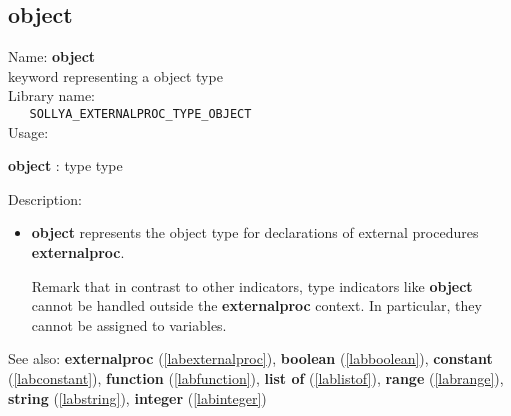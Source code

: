 \subsection{object}
\label{labobject}
\noindent Name: \textbf{object}\\
\phantom{aaa}keyword representing a \sollya object type \\[0.2cm]
\noindent Library name:\\
\verb|   SOLLYA_EXTERNALPROC_TYPE_OBJECT|\\[0.2cm]
\noindent Usage: 
\begin{center}
\textbf{object} : \textsf{type type}\\
\end{center}
\noindent Description: \begin{itemize}

\item \textbf{object} represents the \sollya object type for declarations
   of external procedures \textbf{externalproc}.
    
   Remark that in contrast to other indicators, type indicators like
   \textbf{object} cannot be handled outside the \textbf{externalproc} context.  In
   particular, they cannot be assigned to variables.
\end{itemize}
See also: \textbf{externalproc} (\ref{labexternalproc}), \textbf{boolean} (\ref{labboolean}), \textbf{constant} (\ref{labconstant}), \textbf{function} (\ref{labfunction}), \textbf{list of} (\ref{lablistof}), \textbf{range} (\ref{labrange}), \textbf{string} (\ref{labstring}), \textbf{integer} (\ref{labinteger})

